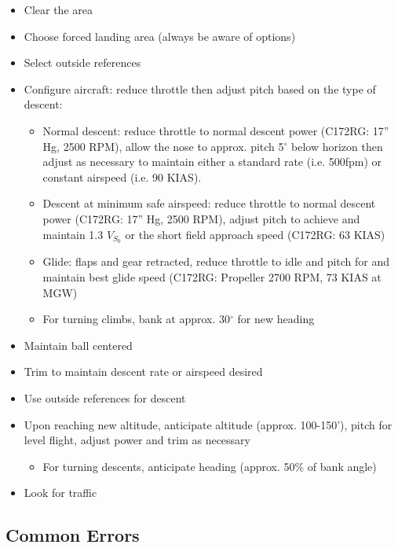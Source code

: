 \begin{itemize}
  \item Clear the area
  \item Choose forced landing area (always be aware of options) 
  \item Select outside references
  \item Configure aircraft: reduce throttle then adjust pitch based on the type
    of descent:
    \begin{itemize}
      \item Normal descent: reduce throttle to normal descent power (C172RG:
        17'' Hg, 2500 RPM), allow the nose to approx. pitch 5$^\circ$ below
        horizon then adjust as necessary to maintain either a standard rate
        (i.e.  500fpm) or constant airspeed (i.e. 90 KIAS). 
      \item Descent at minimum safe airspeed: reduce throttle to normal descent
        power (C172RG: 17'' Hg, 2500 RPM), adjust pitch to achieve and maintain
        1.3 $V_{S_0}$ or the short field approach speed (C172RG: 63 KIAS)
      \item Glide: flaps and gear retracted, reduce throttle to idle and pitch
        for and maintain best glide speed (C172RG: Propeller 2700 RPM, 73 KIAS
        at MGW)
      \item For turning climbs, bank at approx. 30$^\circ$ for new heading
    \end{itemize}
  \item Maintain ball centered
  \item Trim to maintain descent rate or airspeed desired
  \item Use outside references for descent
  \item Upon reaching new altitude, anticipate altitude (approx. 100-150'),
    pitch for level flight, adjust power and trim as necessary
    \begin{itemize}
      \item For turning descents, anticipate heading (approx. 50\% of bank
        angle)
    \end{itemize}
  \item Look for traffic
\end{itemize}

\subsection{Common Errors}

